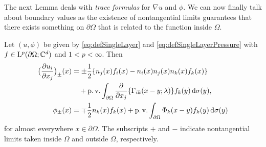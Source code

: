 The next Lemma deals with \emph{trace formulas} for $\nabla u$ and $\phi$. We can now finally talk about boundary values as the existence of nontangential limits guarantees that there exists something on $\partial\Omega$ that is related to the function inside $\Omega$.

\begin{lem}
  \label{lem:traceFormulas}
  Let $(u,\phi)$ be given by \eqref{eq:defSingleLayer} and \eqref{eq:defSingleLayerPressure} with $f \in \mathrm{L}^p(\partial\Omega; \mathbb{C}^d)$ and $1 < p < \infty$.
  Then
  \begin{align}
    \big( \frac{\partial u_i}{\partial x_j} \big)_{\pm}(x) 
    &= \pm \frac{1}{2} \{ n_j(x) f_i(x) - n_i(x) n_j(x) n_k(x) f_k(x) \} \nonumber\\
    &\quad+ \operatorname{p. v.} \int_{\partial\Omega} \frac{\partial}{\partial x_j} \{ \Gamma_{ik} (x - y; \lambda) \} f_k(y) \, {\operatorname{d}\!{\sigma}}(y), \label{eq:traceFormula} \\
    \phi_\pm(x) &= \mp \frac{1}{2} n_k(x) f_k(x) + \operatorname{p. v.}\int_{\partial\Omega} \Phi_k(x - y) f_k(y) \, {\operatorname{d}\!{\sigma}}(y) \nonumber
  \end{align}
  for almost everywhere $x \in \partial\Omega$.
  The subscripts $+$ and $-$ indicate nontangential limits taken inside $\Omega$ and outside $\overline\Omega$, respectively.
\end{lem}

